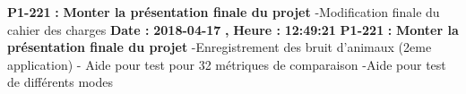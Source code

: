 \documentclass{article}%
\begin{document}
\newline%
%
\textbf{P1{-}221 }%
\textbf{ : }%
\textbf{ Monter la présentation finale du projet }%
\newline%
\newline%
%
{-}Modification finale du cahier des charges\newline%
\newline%
%
\textbf{Date : }%
\textbf{2018{-}04{-}17}%
\textbf{,}%
\textbf{ Heure : }%
\textbf{12:49:21}%
\newline%
%
\textbf{P1{-}221 }%
\textbf{ : }%
\textbf{ Monter la présentation finale du projet }%
\newline%
\newline%
%
{-}Enregistrement des bruit d'animaux (2eme application)\newline%
{-} Aide pour test pour 32 métriques de comparaison\newline%
{-}Aide pour test de différents modes\newline%
\newline%
%
\newpage

%
\end{document}
